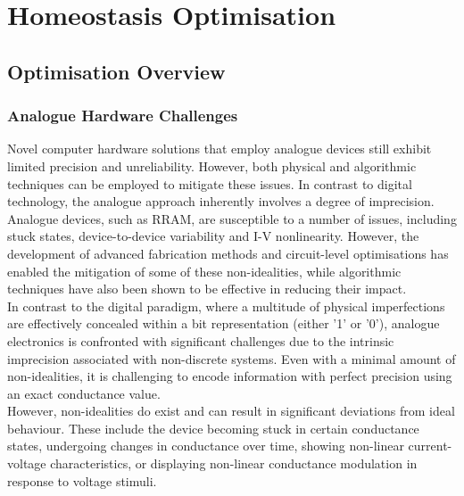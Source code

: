
\chapter{Homeostasis Optimisation}

\section[Optimisation Overview]{Optimisation Overview}

\subsection[Analogue Hardware Challenges]{Analogue Hardware Challenges}

\noindent Novel computer hardware solutions that employ analogue devices still exhibit limited precision and unreliability. However, both physical and algorithmic techniques can be employed to mitigate these issues. In contrast to digital technology, the analogue approach inherently involves a degree of imprecision. \\

\noindent Analogue devices, such as RRAM, are susceptible to a number of issues, including stuck states, device-to-device variability and I-V nonlinearity. However, the development of advanced fabrication methods and circuit-level optimisations has enabled the mitigation of some of these non-idealities, while algorithmic techniques have also been shown to be effective in reducing their impact.\\

\noindent In contrast to the digital paradigm, where a multitude of physical imperfections are effectively concealed within a bit representation (either '1' or '0'), analogue electronics is confronted with significant challenges due to the intrinsic imprecision associated with non-discrete systems. Even with a minimal amount of non-idealities, it is challenging to encode information with perfect precision using an exact conductance value.\\

\noindent However, non-idealities do exist and can result in significant deviations from ideal behaviour. These include the device becoming stuck in certain conductance states, undergoing changes in conductance over time, showing non-linear current-voltage characteristics, or displaying non-linear conductance modulation in response to voltage stimuli. \\

